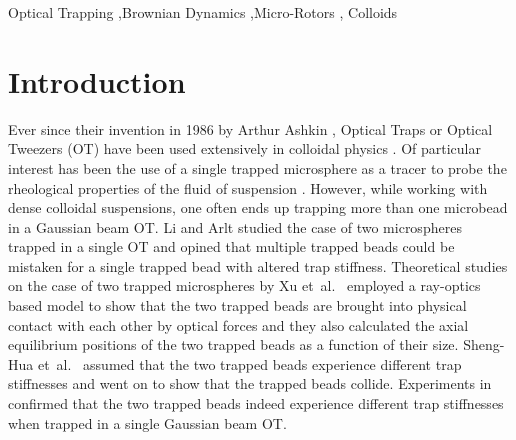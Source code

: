 \documentclass[preprint,  3p]{elsarticle}
\begin{document}
\begin{frontmatter}
		
\begin{keyword}
  Optical Trapping \sep Brownian Dynamics \sep Micro-Rotors \sep
  Colloids
\end{keyword}
		
\end{frontmatter}


\section{Introduction}

Ever since their invention in 1986 by Arthur Ashkin
\cite{Ashkin_1986}, Optical Traps or Optical Tweezers (OT) have been
used extensively in colloidal physics
\cite{Leonardo_2008,Koehler_2011, Curran_1999}.  Of particular
interest has been the use of a single trapped microsphere as a tracer
to probe the rheological properties of the fluid of suspension
\cite{Atakhorrami_2006}.  However, while working with dense colloidal
suspensions, one often ends up trapping more than one microbead in a
Gaussian beam OT.  Li and Arlt \cite{Li_2008} studied the case of two
microspheres trapped in a single OT and opined that multiple trapped
beads could be mistaken for a single trapped bead with altered trap
stiffness. Theoretical studies on the case of two trapped microspheres
by Xu et~al.\ \cite{Xu_2005} employed a ray-optics based model to show
that the two trapped beads are brought into physical contact with each
other by optical forces and they also calculated the axial equilibrium
positions of the two trapped beads as a function of their size.
Sheng-Hua et~al.\ \cite{ShengHua_2005} assumed that the two trapped
beads experience different trap stiffnesses and went on to show that
the trapped beads collide.  Experiments in \cite{Praveen_2016}
confirmed that the two trapped beads indeed experience different trap
stiffnesses when trapped in a single Gaussian beam OT.
\end{document}
